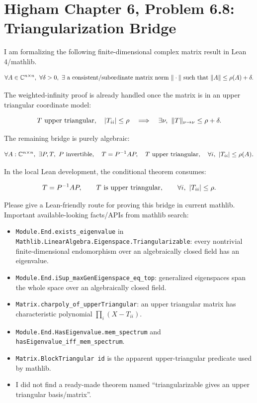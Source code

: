 \section*{Higham Chapter 6, Problem 6.8: Triangularization Bridge}

I am formalizing the following finite-dimensional complex matrix result in Lean
4/mathlib.

\[
\forall A\in\mathbb C^{n\times n},\ \forall \delta>0,\ \exists\hbox{ a
consistent/subordinate matrix norm } \|\cdot\| \hbox{ such that }
\|A\| \le \rho(A)+\delta .
\]

The weighted-infinity proof is already handled once the matrix is in an upper
triangular coordinate model:

\[
T\hbox{ upper triangular},\quad |T_{ii}|\le \rho
\quad\Longrightarrow\quad
\exists \nu,\ \|T\|_{\nu\to\nu}\le \rho+\delta .
\]

The remaining bridge is purely algebraic:

\[
\forall A:\mathbb C^{n\times n},\ \exists P,T,\ P\hbox{ invertible},
\quad T=P^{-1}AP,\quad T\hbox{ upper triangular},\quad
\forall i,\ |T_{ii}|\le \rho(A).
\]

In the local Lean development, the conditional theorem consumes:

\[
T = P^{-1} A P,\qquad T\hbox{ is upper triangular},\qquad
\forall i,\ |T_{ii}|\le \rho .
\]

Please give a Lean-friendly route for proving this bridge in current mathlib.
Important available-looking facts/APIs from mathlib search:

\begin{itemize}
\item \texttt{Module.End.exists\_eigenvalue} in
\texttt{Mathlib.LinearAlgebra.Eigenspace.Triangularizable}: every nontrivial
finite-dimensional endomorphism over an algebraically closed field has an
eigenvalue.
\item \texttt{Module.End.iSup\_maxGenEigenspace\_eq\_top}: generalized
eigenspaces span the whole space over an algebraically closed field.
\item \texttt{Matrix.charpoly\_of\_upperTriangular}: an upper triangular matrix
has characteristic polynomial \(\prod_i (X-T_{ii})\).
\item \texttt{Module.End.HasEigenvalue.mem\_spectrum} and
\texttt{hasEigenvalue\_iff\_mem\_spectrum}.
\item \texttt{Matrix.BlockTriangular id} is the apparent upper-triangular
predicate used by mathlib.
\item I did not find a ready-made theorem named ``triangularizable gives an
upper triangular basis/matrix''.
\end{itemize}


